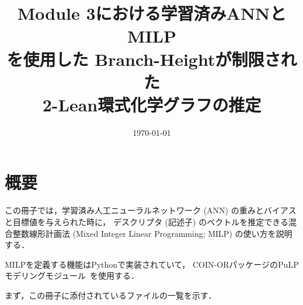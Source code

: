 \documentclass[11pt, titlepage, dvipdfmx, twoside]{jarticle}
\title{\huge{Module 3における学習済みANNとMILP\\を使用した Branch-Heightが制限された\\ 2-Lean環式化学グラフの推定}}
\author{\project}
\newcommand{\target}{目標}
\begin{document}
\makeatletter 
\let\c@lstlisting\c@figure
\makeatother


\date{\today}

\maketitle


\thispagestyle{empty}
\tableofcontents
\clearpage



\section{概要}
\label{sec:Intro}

この冊子では，学習済み人工ニューラルネットワーク (ANN) の重みとバイアスと\target 値を与えられた時に，
デスクリプタ (記述子) のベクトルを推定できる混合整数線形計画法 (Mixed Integer Linear Programming; MILP) の使い方を説明する．

MILPを定義する機能はPythonで実装されていて，
COIN-ORパッケージのPuLPモデリングモジュール~\cite{PuLP1,PuLP2,PuLP3,PuLP4}を使用する．

まず，この冊子に添付されているファイルの一覧を示す．
\end{document}
